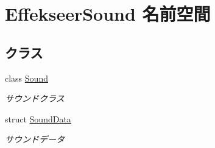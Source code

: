 \hypertarget{namespace_effekseer_sound}{}\section{Effekseer\+Sound 名前空間}
\label{namespace_effekseer_sound}
\subsection*{クラス}
\begin{DoxyCompactItemize}
\item 
class \mbox{\hyperlink{class_effekseer_sound_1_1_sound}{Sound}}
\begin{DoxyCompactList}\small\item\em サウンドクラス \end{DoxyCompactList}\item 
struct \mbox{\hyperlink{struct_effekseer_sound_1_1_sound_data}{Sound\+Data}}
\begin{DoxyCompactList}\small\item\em サウンドデータ \end{DoxyCompactList}\end{DoxyCompactItemize}
